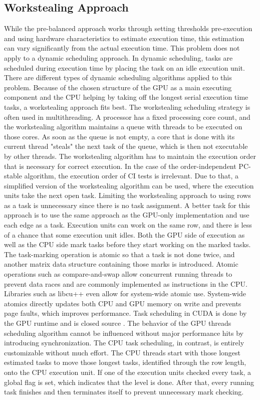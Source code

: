 \subsection{Workstealing Approach}
While the pre-balanced approach works through setting thresholds pre-execution and using hardware characteristics to estimate execution time, this estimation can vary significantly from the actual execution time. This problem does not apply to a dynamic scheduling approach. In dynamic scheduling, tasks are scheduled during execution time by placing the task on an idle execution unit. There are different types of dynamic scheduling algorithms applied to this problem.
Because of the chosen structure of the GPU as a main executing component and the CPU helping by taking off the longest serial execution time tasks, a workstealing approach fits best. The workstealing scheduling strategy is often used in multithreading. A processor has a fixed processing core count, and the workstealing algorithm maintains a queue with threads to be executed on those cores. As soon as the queue is not empty, a core that is done with its current thread "steals" the next task of the queue, which is then not executable by other threads. The workstealing algorithm has to maintain the execution order that is necessary for correct execution. \cite{blumofeSchedulingMultithreadedComputations1999}
In the case of the order-independent PC-stable algorithm, the execution order of CI tests is irrelevant. Due to that, a simplified version of the workstealing algorithm can be used, where the execution units take the next open task.
Limiting the workstealing approach to using rows as a task is unnecessary since there is no task assignment. A better task for this approach is to use the same approach as the GPU-only implementation and use each edge as a task. Execution units can work on the same row, and there is less of a chance that some execution unit idles.
Both the GPU side of execution as well as the CPU side mark tasks before they start working on the marked tasks. The task-marking operation is atomic so that a task is not done twice, and another matrix data structure containing those marks is introduced. Atomic operations such as compare-and-swap allow concurrent running threads to prevent data races and are commonly implemented as instructions in the CPU.
Libraries such as libcu++ \cite{NVIDIALibcudacxx2021} even allow for system-wide atomic use. System-wide atomics directly updates both CPU and GPU memory on write and prevents page faults, which improves performance.
Task scheduling in CUDA is done by the GPU runtime and is closed source \cite{olmedoDissectingCUDAScheduling2020}. The behavior of the GPU threads scheduling algorithm cannot be influenced without major performance hits by introducing synchronization. The CPU task scheduling, in contrast, is entirely customizable without much effort. The CPU threads start with those longest estimated tasks to move those longest tasks, identified through the row length, onto the CPU execution unit.
If one of the execution units checked every task, a global flag is set, which indicates that the level is done. After that, every running task finishes and then terminates itself to prevent unnecessary mark checking.

